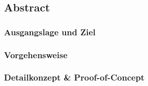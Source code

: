 
\subsection*{Abstract}

\subsubsection*{Ausgangslage und Ziel}


\subsubsection*{Vorgehensweise}


\subsubsection*{Detailkonzept \& Proof-of-Concept}
